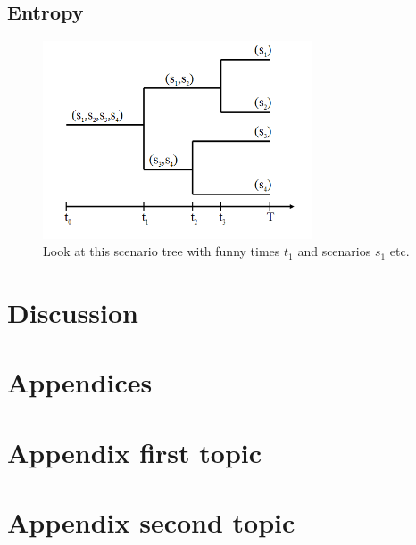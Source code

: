 \documentclass[11pt,twoside]{article}
\numberwithin{Theorem}{section}
\numberwithin{Definition}{section}
\numberwithin{Lemma}{section}
\numberwithin{Algorithm}{section}
\numberwithin{equation}{section}
\begin{document}
\subsection{Entropy}
\begin{figure}[!ht]
\centering
\includegraphics[width=8cm]{scenTree.png}
\caption{Look at this scenario tree with funny times $t_{1}$ and scenarios $s_{1}$ etc.}
\label{fig:scenarioTree}
\end{figure}

\cleardoublepage

\section{Discussion}
\blindtext
\clearpage


\clearpage

\appendix
\section*{Appendices}
\blindtext

\section{Appendix first topic}
\label{app:one}
\blindtext

\section{Appendix second topic}
\label{app:one}
\blindtext
\clearpage
\end{document}
